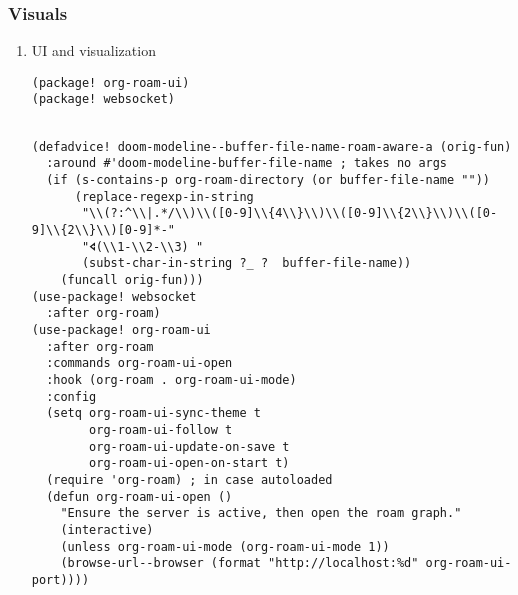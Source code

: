 \documentclass[c]{article}
\theoremstyle{plain}%
\theoremstyle{definition}
\theoremstyle{remark}
\begin{document}
\subsubsection{Visuals}
\label{sec:org24e4ccd}
\begin{enumerate}
\item UI and visualization
\label{sec:orgd8b1cf9}
\begin{verbatim}
(package! org-roam-ui)
(package! websocket)
\end{verbatim}
\begin{verbatim}

(defadvice! doom-modeline--buffer-file-name-roam-aware-a (orig-fun)
  :around #'doom-modeline-buffer-file-name ; takes no args
  (if (s-contains-p org-roam-directory (or buffer-file-name ""))
      (replace-regexp-in-string
       "\\(?:^\\|.*/\\)\\([0-9]\\{4\\}\\)\\([0-9]\\{2\\}\\)\\([0-9]\\{2\\}\\)[0-9]*-"
       "🢔(\\1-\\2-\\3) "
       (subst-char-in-string ?_ ?  buffer-file-name))
    (funcall orig-fun)))
(use-package! websocket
  :after org-roam)
(use-package! org-roam-ui
  :after org-roam
  :commands org-roam-ui-open
  :hook (org-roam . org-roam-ui-mode)
  :config
  (setq org-roam-ui-sync-theme t
        org-roam-ui-follow t
        org-roam-ui-update-on-save t
        org-roam-ui-open-on-start t)
  (require 'org-roam) ; in case autoloaded
  (defun org-roam-ui-open ()
    "Ensure the server is active, then open the roam graph."
    (interactive)
    (unless org-roam-ui-mode (org-roam-ui-mode 1))
    (browse-url--browser (format "http://localhost:%d" org-roam-ui-port))))
\end{verbatim}
\end{enumerate}
\end{document}
